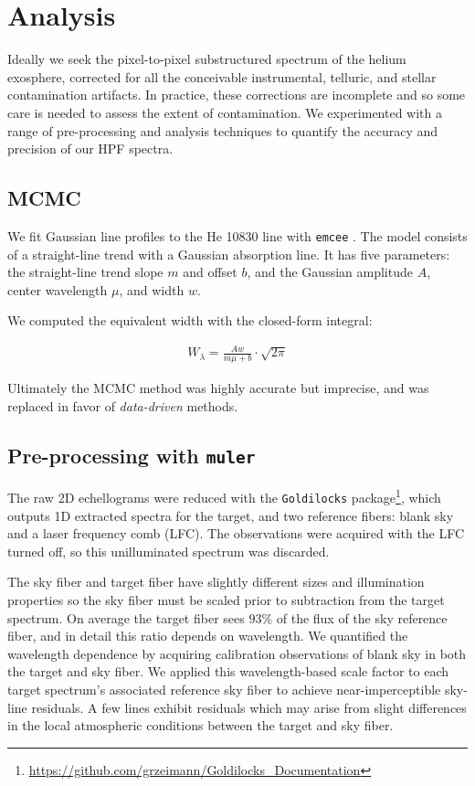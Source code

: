 \documentclass[modern]{aastex631}
\begin{document}
\section{Analysis}
Ideally we seek the pixel-to-pixel substructured spectrum of the helium exosphere, corrected for all the conceivable instrumental, telluric, and stellar contamination artifacts.  In practice, these corrections are incomplete and so some care is needed to assess the extent of contamination.  We experimented with a range of pre-processing and analysis techniques to quantify the accuracy and precision of our HPF spectra.


\subsection{MCMC}
We fit Gaussian line profiles to the He 10830 line with \texttt{emcee} \citep{foreman13}. The model consists of a straight-line trend with a Gaussian absorption line.  It has five parameters: the straight-line trend slope $m$ and offset $b$, and the Gaussian amplitude $A$, center wavelength $\mu$, and width $w$.

We computed the equivalent width with the closed-form integral:

\begin{gather}
    W_\lambda=\frac{Aw}{m \mu + b}\cdot\sqrt{2\pi}
\end{gather}

Ultimately the MCMC method was highly accurate but imprecise, and was replaced in favor of \emph{data-driven} methods.

\subsection{Pre-processing with \texttt{muler}}

The raw 2D echellograms were reduced with the \texttt{Goldilocks} package\footnote{\url{https://github.com/grzeimann/Goldilocks_Documentation}}, which outputs 1D extracted spectra for the target, and two reference fibers: blank sky and a laser frequency comb (LFC).  The observations were acquired with the LFC turned off, so this unilluminated spectrum was discarded.

The sky fiber and target fiber have slightly different sizes and illumination properties so the sky fiber must be scaled prior to subtraction from the target spectrum.  On average the target fiber sees $93\%$ of the flux of the sky reference fiber, and in detail this ratio depends on wavelength.  We quantified the wavelength dependence by acquiring calibration observations of blank sky in both the target and sky fiber.  We applied this wavelength-based scale factor to each target spectrum's associated reference sky fiber to achieve near-imperceptible sky-line residuals.  A few lines exhibit residuals which may arise from slight differences in the local atmospheric conditions between the target and sky fiber.
\end{document}
